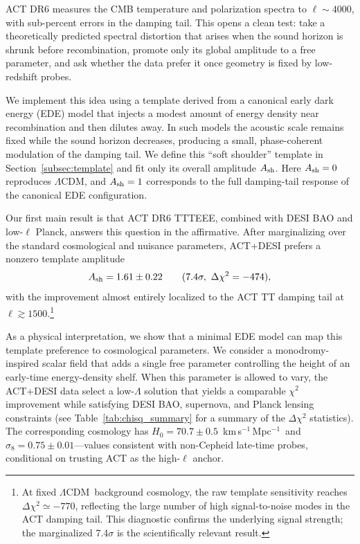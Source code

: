 \documentclass[onecolumn,showpacs,preprintnumbers,amsmath,amssymb,prd]{revtex4-2}
\newcommand{\lcdm}{$\Lambda$CDM}
\newcommand{\kms}{km\,s$^{-1}$\,Mpc$^{-1}$}
\begin{document}
ACT DR6 measures the CMB temperature and polarization spectra to $\ell \sim 4000$, with sub-percent errors in the damping tail. This opens a clean test: take a theoretically predicted spectral distortion that arises when the sound horizon is shrunk before recombination, promote only its global amplitude to a free parameter, and ask whether the data prefer it once geometry is fixed by low-redshift probes.

We implement this idea using a template derived from a canonical early dark energy (EDE) model that injects a modest amount of energy density near recombination and then dilutes away. In such models the acoustic scale remains fixed while the sound horizon decreases, producing a small, phase-coherent modulation of the damping tail. We define this ``soft shoulder'' template in Section~\ref{subsec:template} and fit only its overall amplitude $A_{\rm sh}$. Here $A_{\rm sh} = 0$ reproduces \lcdm, and $A_{\rm sh} = 1$ corresponds to the full damping-tail response of the canonical EDE configuration.

Our first main result is that ACT DR6 TTTEEE, combined with DESI BAO and low-$\ell$ Planck, answers this question in the affirmative. After marginalizing over the standard cosmological and nuisance parameters, ACT+DESI prefers a nonzero template amplitude
\begin{equation}
A_{\rm sh} = 1.61 \pm 0.22 \qquad (7.4\sigma,\ \Delta\chi^2 = -474),
\end{equation}
with the improvement almost entirely localized to the ACT TT damping tail at $\ell \gtrsim 1500$.\footnote{At fixed \lcdm\ background cosmology, the raw template sensitivity reaches $\Delta\chi^2 \simeq -770$, reflecting the large number of high signal-to-noise modes in the ACT damping tail. This diagnostic confirms the underlying signal strength; the marginalized 7.4$\sigma$ is the scientifically relevant result.}

As a physical interpretation, we show that a minimal EDE model can map this template preference to cosmological parameters. We consider a monodromy-inspired scalar field that adds a single free parameter controlling the height of an early-time energy-density shelf. When this parameter is allowed to vary, the ACT+DESI data select a low-$\Lambda$ solution that yields a comparable $\chi^2$ improvement while satisfying DESI BAO, supernova, and Planck lensing constraints (see Table~\ref{tab:chisq_summary} for a summary of the $\Delta\chi^2$ statistics). The corresponding cosmology has $H_0 = 70.7 \pm 0.5$~\kms\ and $\sigma_8 = 0.75 \pm 0.01$---values consistent with non-Cepheid late-time probes, conditional on trusting ACT as the high-$\ell$ anchor.
\end{document}
